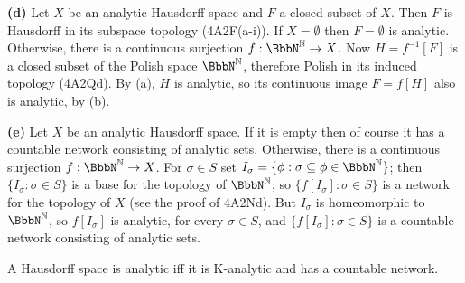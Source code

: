 {\medskip

{\bf (d)} Let $X$ be an analytic Hausdorff space and $F$ a closed subset
of $X$.   Then $F$ is Hausdorff in its subspace topology (4A2F(a-i)).
If $X=\emptyset$ then $F=\emptyset$ is analytic.   Otherwise, there is a
continuous surjection $f:\NN\to X$.   Now $H=f^{-1}[F]$ is a closed
subset of the Polish space $\NN$, therefore Polish in its induced
topology (4A2Qd).   By (a), $H$ is analytic, so its continuous
image $F=f[H]$ also is analytic, by (b).

\medskip

{\bf (e)} Let $X$ be an analytic Hausdorff space.   If it is empty then
of course it has a countable network consisting of analytic sets.
Otherwise, there is a continuous surjection $f:\NN\to X$.   For
$\sigma\in S$ set $I_{\sigma}=\{\phi:\sigma\subseteq\phi\in\NN\}$;
then $\{I_{\sigma}:\sigma\in S\}$ is a base for the topology of $\NN$,
so $\{f[I_{\sigma}]:\sigma\in S\}$ is a network for the topology of
$X$ (see the proof of 4A2Nd).   But $I_{\sigma}$ is homeomorphic to
$\NN$, so $f[I_{\sigma}]$ is analytic, for every $\sigma\in S$, and
$\{f[I_{\sigma}]:\sigma\in S\}$ is a countable network consisting of
analytic sets.
}%

 A Hausdorff space is analytic iff it is
K-analytic and has a countable network.

